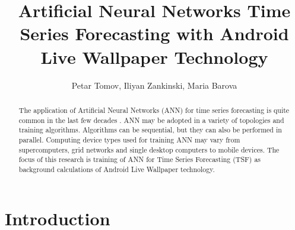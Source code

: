 \documentclass{llncs}
\begin{document}
\title{Artificial Neural Networks Time Series Forecasting with Android Live Wallpaper Technology} 

\author{Petar Tomov, Iliyan Zankinski, Maria Barova}



\maketitle


\begin{abstract}
The application of Artificial Neural Networks (ANN) for time series forecasting is quite common in the last few decades \cite{atanasova01}. ANN may be adopted in a variety of topologies and training algorithms. Algorithms can be sequential, but they can also be performed in parallel. Computing device types used for training ANN may vary from supercomputers, grid networks and single desktop computers to mobile devices. The focus of this research is training of ANN for Time Series Forecasting (TSF) as background calculations of Android Live Wallpaper technology. 

\end{abstract}


\section{Introduction}
\end{document}
